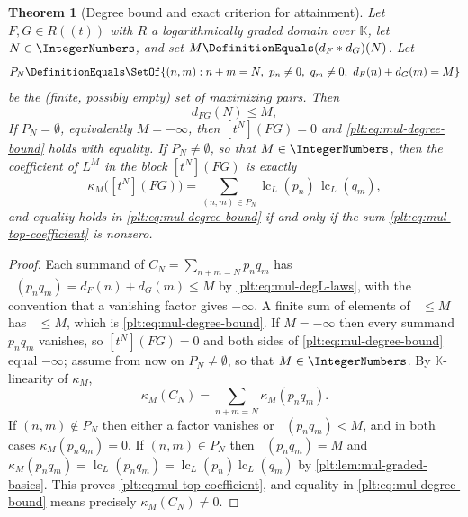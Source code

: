 \documentclass[11pt,oneside]{article}
\theoremstyle{plain}
\newtheorem{theorem}{Theorem}[section]
\theoremstyle{definition}
\theoremstyle{remark}
\newcommand{\K}{\mathbb{K}}
\DeclareMathOperator{\lc}{lc}
\DeclareMathOperator{\degL}{deg_{L}}
\newcommand{\dprofile}[1]{d_{#1}}                        %
\begin{document}
\begin{theorem}[Degree bound and exact criterion for attainment]
\label{plt:thm:mul-degree-bound}
Let $F,G\in R((t))$ with $R$ a logarithmically graded domain over $\K$, let
$N\in\IntegerNumbers$, and set
$M\DefinitionEquals(\dprofile{F}\ast\dprofile{G})(N)$.  Let
\[
 P_N\DefinitionEquals
 \SetOf{(n,m):n+m=N,\ p_n\ne0,\ q_m\ne0,\
        \dprofile{F}(n)+\dprofile{G}(m)=M}
\]
be the (finite, possibly empty) set of maximizing pairs.  Then
\begin{equation}\label{plt:eq:mul-degree-bound}
 \dprofile{FG}(N)\le M,
\end{equation}
If $P_N=\emptyset$, equivalently $M=-\infty$, then $[t^N](FG)=0$ and
\eqref{plt:eq:mul-degree-bound} holds with equality.  If $P_N\ne\emptyset$,
so that $M\in\IntegerNumbers$, then the coefficient of $L^{M}$ in the block
$[t^N](FG)$ is exactly
\begin{equation}\label{plt:eq:mul-top-coefficient}
 \kappa_{M}\bigl([t^N](FG)\bigr)
 =\sum_{(n,m)\in P_N}\lc_L(p_n)\,\lc_L(q_m),
\end{equation}
and equality holds in \eqref{plt:eq:mul-degree-bound} if and only if the
sum \eqref{plt:eq:mul-top-coefficient} is nonzero.
\end{theorem}

\begin{proof}
Each summand of $C_N=\sum_{n+m=N}p_nq_m$ has
$\degL(p_nq_m)=\dprofile{F}(n)+\dprofile{G}(m)\le M$ by
\eqref{plt:eq:mul-degL-laws}, with the convention that a vanishing factor
gives $-\infty$.  A finite sum of elements of $\degL\le M$ has
$\degL\le M$, which is \eqref{plt:eq:mul-degree-bound}.  If $M=-\infty$ then
every summand $p_nq_m$ vanishes, so $[t^N](FG)=0$ and both sides of
\eqref{plt:eq:mul-degree-bound} equal $-\infty$; assume from now on
$P_N\ne\emptyset$, so that $M\in\IntegerNumbers$.  By $\K$-linearity of
$\kappa_M$,
\[
 \kappa_M(C_N)=\sum_{n+m=N}\kappa_M(p_nq_m).
\]
If $(n,m)\notin P_N$ then either a factor vanishes or
$\degL(p_nq_m)<M$, and in both cases $\kappa_M(p_nq_m)=0$.  If
$(n,m)\in P_N$ then $\degL(p_nq_m)=M$ and
$\kappa_M(p_nq_m)=\lc_L(p_nq_m)=\lc_L(p_n)\lc_L(q_m)$ by
\cref{plt:lem:mul-graded-basics}.  This proves
\eqref{plt:eq:mul-top-coefficient}, and equality in
\eqref{plt:eq:mul-degree-bound} means precisely $\kappa_M(C_N)\ne0$.
\end{proof}
\end{document}
